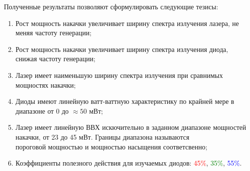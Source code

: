 \documentclass[a4paper]{article}
\begin{document}
    \par Полученные результаты позволяют сформулировать следующие тезисы:

        \begin{enumerate}
            \item Рост мощность накачки увеличивает ширину спектра излучения лазера, не меняя частоту генерации;
            \item Рост мощность накачки увеличивает ширину спектра излучения диода, снижая частоту генерации;
            \item Лазер имеет наименьшую ширину спектра излучения при сравнимых мощностях накачки;
            \item Диоды имеют линейную ватт-ваттную характеристику по крайней мере в диапазоне от 0 до {$\approx50$} мВт;
            \item Лазер имеет линейную ВВХ искючительно в заданном диапазоне мощностей накачки, от 23 до 45 мВт. Границы диапазона называются {$\textit{пороговой мощностью}$} и {$\textit{мощностью насыщения}$} соответсвенно;
            \item Коэффициенты полезного действия для изучаемых диодов: \textcolor{red}{45\%}, \textcolor{green}{35\%}, \textcolor{blue}{55\%}.
        \end{enumerate}
    
\end{document}
